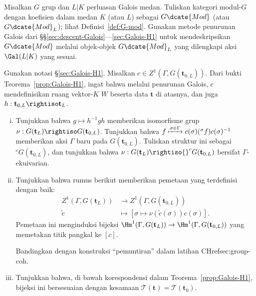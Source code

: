 	\item Misalkan $G$ grup dan $L|K$ perluasan Galois medan. Tuliskan kategori
	modul-$G$ dengan koefisien dalam medan $K$ (atau $L$) sebagai
	$G\dcate{Mod}$ (atau $G\dcate{Mod}_L$); lihat
	Definisi~\ref{def:G-mod}. Gunakan metode penurunan Galois dari
	\S\S\ref{sec:descent-Galois}---\ref{sec:Galois-H1} untuk mendeskripsikan
	$G\dcate{Mod}$ melalui objek-objek $G\dcate{Mod}_L$ yang dilengkapi aksi
	$\Gal(L|K)$ yang sesuai.

	\item Gunakan notasi \S\ref{sec:Galois-H1}. Misalkan
	$c\in Z^1(\Gamma,G(\mathbf{t}_{0,L}))$. Dari bukti
	Teorema~\ref{prop:Galois-H1}, ingat bahwa melalui penurunan Galois, $c$
	mendefinisikan ruang vektor-$K$ $W$ beserta data $\mathbf{t}$ di atasnya,
	dan juga $h:\mathbf{t}_{0,L}\rightiso\mathbf{t}_L$.
	\begin{enumerate}[(i)]
		\item Tunjukkan bahwa $g\mapsto h^{-1}gh$ memberikan isomorfisme grup
		$\nu:G(\mathbf{t}_L)\rightiso G(\mathbf{t}_{0,L})$. Tunjukkan bahwa
		$ f \xmapsto{\sigma \in \Gamma} c(\sigma)({}^\sigma f)c(\sigma)^{-1} $
		memberikan aksi $\Gamma$ baru pada $G(\mathbf{t}_{0,L})$. Tuliskan
		struktur ini sebagai ${}^cG(\mathbf{t}_{0,L})$, dan tunjukkan bahwa
		$\nu:G(\mathbf{t}_L)\rightiso{}^cG(\mathbf{t}_{0,L})$ bersifat
		$\Gamma$-ekuivarian.

		\item Tunjukkan bahwa rumus berikut memberikan pemetaan yang
		terdefinisi dengan baik:
		\begin{align*}
			Z^1(\Gamma, G(\mathbf{t}_L)) & \to Z^1(\Gamma, G(\mathbf{t}_{0, L})) \\
			\tilde{c} & \mapsto \left[\sigma \mapsto \nu(\tilde{c}(\sigma)) c(\sigma) \right].
		\end{align*}
		Pemetaan ini menginduksi bijeksi
		$\Hm^1(\Gamma,G(\mathbf{t}_L))\to
		\Hm^1(\Gamma,G(\mathbf{t}_{0,L}))$ yang memetakan titik pangkal ke
		$[c]$.
		\begin{hint}
			Bandingkan dengan konstruksi ``pemuntiran'' dalam latihan
			CHref{sec:group-coh}.
		\end{hint}

		\item Tunjukkan bahwa, di bawah korespondensi dalam
		Teorema~\ref{prop:Galois-H1}, bijeksi ini bersesuaian dengan kesamaan
		$\mathscr{T}(\mathbf{t})=\mathscr{T}(\mathbf{t}_0)$.
	\end{enumerate}

